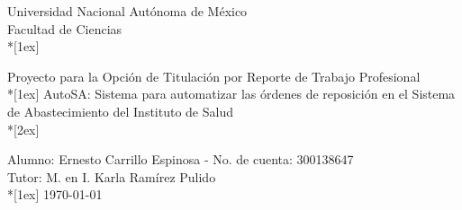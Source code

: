 \documentclass[letterpaper,11pt]{article}
\begin{document}
\begin{center}
\begin{Large}
Universidad Nacional Autónoma de México\\
Facultad de Ciencias\\*[1ex]
\end{Large}
\begin{LARGE}
Proyecto para la Opción de Titulación por Reporte de Trabajo Profesional\\*[1ex]
AutoSA: Sistema para automatizar las órdenes de reposición en el Sistema de Abastecimiento del Instituto de Salud\\*[2ex]
\end{LARGE}
Alumno: Ernesto Carrillo Espinosa - No. de cuenta: 300138647\\
Tutor: M. en I. Karla Ramírez Pulido\\*[1ex]
\today
\end{center}
\end{document}
